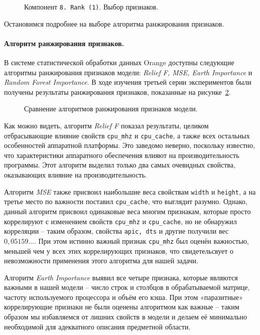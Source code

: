 \begin{figure}[H]
    \caption{Компонент \texttt{8. Rank (1)}. Выбор признаков.}
    \label{img:8-Rank-1}
\end{figure}

Остановимся подробнее на выборе алгоритма ранжирования признаков.

\paragraph{Алгоритм ранжирования признаков.}
\label{choice-of-feature-ranking-algorithm}

В системе статистической обработки данных Orange доступны следующие алгоритмы ранжирования признаков модели: \textit{Relief F, MSE, Earth Importance} и \textit{Random Forest Importance}. В ходе изучения третьей серии экспериментов были получены результаты ранжирования признаков, показанные на рисунке~\ref{img:ranking-full}.

\begin{figure}[H]
    \caption{Сравнение алгоритмов ранжирования признаков модели.}
    \label{img:ranking-full}
\end{figure}

Как можно видеть, алгоритм \textit{Relief F} показал результаты, целиком отбрасывающие влияние свойств \texttt{cpu_mhz} и \texttt{cpu_cache}, а также всех остальных особенностей аппаратной платформы. Это заведомо неверно, поскольку известно, что характеристики аппаратного обеспечения влияют на производительность программы. Этот алгоритм выделил только два самых очевидных свойства, оказывающих влияние на производительность.

Алгоритм \textit{MSE} также присвоил наибольшие веса свойствам \texttt{width} и \texttt{height}, а на третье место по важности поставил \texttt{cpu_cache}, что выглядит разумно. Однако, данный алгоритм присвоил одинаковые веса многим признакам, которые просто коррелируют с изменением свойств \texttt{cpu_mhz} и \texttt{cpu_cache}, но не обнаружил корреляции -- таким образом, свойства \texttt{apic, dts} и другие получили вес $0,05159...$. При этом истинно важный признак \texttt{cpu_mhz} был оценён важностью, меньшей чем у всех этих коррелирующих признаков, что свидетельсвует о невозможности применения этого алгоритма для нашей задачи.

Алгоритм \textit{Earth Importance} выявил все четыре признака, которые являются важными в нашей модели -- число строк и столбцов в обрабатываемой матрице, частоту используемого процессора и объём его кэша. При этом «паразитные» коррелирующие признаки не были оценены алгоритмом как важные -- таким образом мы избавляемся от лишних свойств в модели и делаем её минимально необходимой для адекватного описания предметной области.

